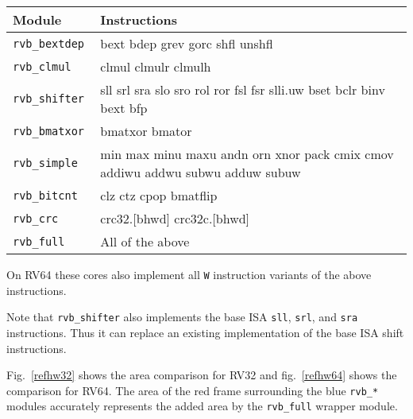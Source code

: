 \begin{center}
\begin{tabular}{lp{6cm}}
Module & Instructions \\
\hline
\tt rvb\_bextdep  & bext bdep grev gorc shfl unshfl                                               \\
\tt rvb\_clmul    & clmul clmulr clmulh                                                           \\
\tt rvb\_shifter  & sll srl sra slo sro rol ror fsl fsr slli.uw bset bclr binv bext bfp           \\
\tt rvb\_bmatxor  & bmatxor bmator                                                                \\
\tt rvb\_simple   & min max minu maxu andn orn xnor pack cmix cmov addiwu addwu subwu adduw subuw \\
\tt rvb\_bitcnt   & clz ctz cpop bmatflip                                                         \\
\tt rvb\_crc      & crc32.[bhwd] crc32c.[bhwd]                                                    \\
\tt rvb\_full     & All of the above                                                              \\
\end{tabular}
\end{center}

On RV64 these cores also implement all {\tt *W} instruction variants of the above instructions.

Note that {\tt rvb\_shifter} also implements the base ISA {\tt sll}, {\tt srl},
and {\tt sra} instructions. Thus it can replace an existing implementation of
the base ISA shift instructions.

Fig.~\ref{refhw32} shows the area comparison for RV32 and fig.~\ref{refhw64} shows the comparison for RV64.
The area of the red frame surrounding the blue {\tt rvb\_*} modules accurately represents the added area
by the {\tt rvb\_full} wrapper module.

